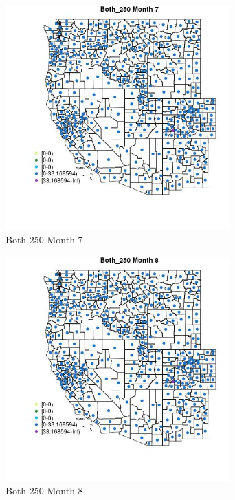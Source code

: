 \begin{figure} 
\centering  
\includegraphics[width=0.77\textwidth]{Code_Outputs/df_report_ML_predictors_CountyCentroid_Locations_Dates_2008-01-01to2018-12-31_MapObsMo7Both_250.jpg} 
\caption{\label{fig:df_report_ML_predictors_CountyCentroid_Locations_Dates_2008-01-01to2018-12-31MapObsMo7Both_250}Both-250 Month 7} 
\end{figure} 
 

\begin{figure} 
\centering  
\includegraphics[width=0.77\textwidth]{Code_Outputs/df_report_ML_predictors_CountyCentroid_Locations_Dates_2008-01-01to2018-12-31_MapObsMo8Both_250.jpg} 
\caption{\label{fig:df_report_ML_predictors_CountyCentroid_Locations_Dates_2008-01-01to2018-12-31MapObsMo8Both_250}Both-250 Month 8} 
\end{figure} 
 

